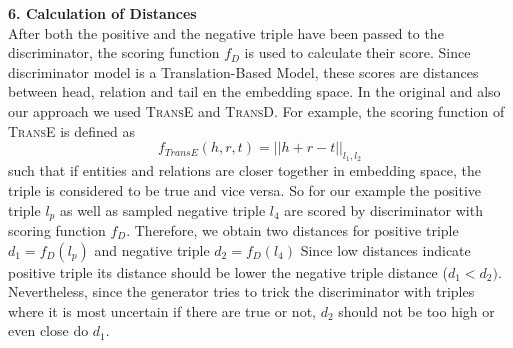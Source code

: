 \textbf{6. Calculation of Distances}\\

After both the positive and the negative triple have been passed to the discriminator, the scoring function $f_D$ is used to calculate their score.
Since discriminator model is a Translation-Based Model, these scores are distances between head, relation and tail en the embedding space.
In the original \kbgan and also our approach we used \textsc{TransE} and \textsc{TransD}.
For example, the scoring function of \textsc{TransE} is defined as 
\begin{equation}
    f_{TransE}(h,r,t) = || h + r - t ||_{l_1, l_2}
\end{equation}
such that if entities and relations are closer together in embedding space, the triple is considered to be true and vice versa.
So for our example the positive triple $l_p$ as well as sampled negative triple $l_4$ are scored by discriminator with scoring function $f_D$.
Therefore, we obtain two distances for positive triple $d_1 = f_D(l_p)$ and negative triple $d_2 = f_D(l_4)$
Since low distances indicate positive triple its distance should be lower the negative triple distance ($d_1 < d_2)$.
Nevertheless, since the generator tries to trick the discriminator with triples where it is most uncertain if there are true or not, $d_2$ should not be too high or even close do $d_1$.






